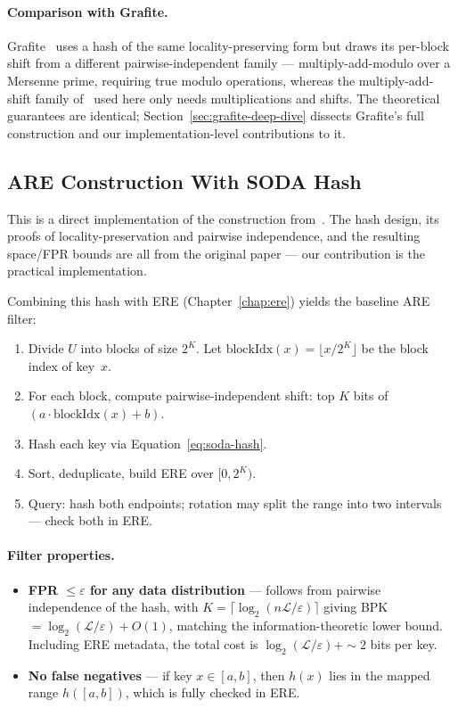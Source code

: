\paragraph{Comparison with Grafite.}
Grafite~\citep{grafite2024} uses a hash of the same locality-preserving form but draws
its per-block shift from a different pairwise-independent family --- multiply-add-modulo
over a Mersenne prime, requiring true modulo operations, whereas the multiply-add-shift
family of~\citet{dhkp1997closestpair} used here only needs multiplications and shifts.
The theoretical guarantees are identical;
Section~\ref{sec:grafite-deep-dive} dissects Grafite's full construction and our
implementation-level contributions to it.

\subsection{ARE Construction With SODA Hash}

This is a direct implementation of the construction from~\citet[§3]{goswami2015approximate}.
The hash design, its proofs of locality-preservation and pairwise independence, and the
resulting space/FPR bounds are all from the original paper --- our contribution is the
practical implementation.

Combining this hash with ERE (Chapter~\ref{chap:ere}) yields the baseline ARE filter:
\begin{enumerate}
    \item Divide $U$ into blocks of size $2^K$. Let $\text{blockIdx}(x) = \lfloor x / 2^K \rfloor$
    be the block index of key~$x$.
    \item For each block, compute pairwise-independent shift: top $K$ bits of
    $(a \cdot \text{blockIdx}(x) + b)$.
    \item Hash each key via Equation~\eqref{eq:soda-hash}.
    \item Sort, deduplicate, build ERE over $[0, 2^K)$.
    \item Query: hash both endpoints; rotation may split the range into two
    intervals --- check both in ERE.
\end{enumerate}

\paragraph{Filter properties.}
\begin{itemize}
    \item \textbf{FPR $\leq \varepsilon$ for any data distribution} --- follows from pairwise
    independence of the hash, with $K = \lceil \log_2(n\mathcal{L}/\varepsilon) \rceil$ giving
    BPK~$= \log_2(\mathcal{L}/\varepsilon) + O(1)$, matching the information-theoretic lower bound.
    Including ERE metadata, the total cost is $\log_2(\mathcal{L}/\varepsilon) + {\sim}2$ bits per key.
    \item \textbf{No false negatives} --- if key $x \in [a, b]$, then
    $h(x)$ lies in the mapped range $h([a, b])$, which is fully checked in ERE.
\end{itemize}

